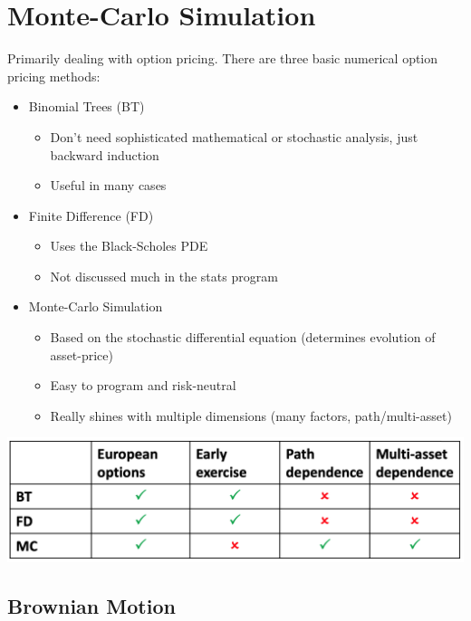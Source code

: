 \documentclass[
  oneside]{book}
\providecommand{\tightlist}{%
  \setlength{\itemsep}{0pt}\setlength{\parskip}{0pt}}
\begin{document}
\hypertarget{monte-carlo-simulation}{%
\chapter{Monte-Carlo Simulation}\label{monte-carlo-simulation}}

Primarily dealing with option pricing. There are three basic numerical option pricing methods:

\begin{itemize}
\tightlist
\item
  Binomial Trees (BT)

  \begin{itemize}
  \tightlist
  \item
    Don't need sophisticated mathematical or stochastic analysis, just backward induction
  \item
    Useful in many cases
  \end{itemize}
\item
  Finite Difference (FD)

  \begin{itemize}
  \tightlist
  \item
    Uses the Black-Scholes PDE
  \item
    Not discussed much in the stats program
  \end{itemize}
\item
  Monte-Carlo Simulation

  \begin{itemize}
  \tightlist
  \item
    Based on the stochastic differential equation (determines evolution of asset-price)
  \item
    Easy to program and risk-neutral
  \item
    Really shines with multiple dimensions (many factors, path/multi-asset)
  \end{itemize}
\end{itemize}

\includegraphics{Notes/Obsidian-Attachments/10-Monte-Carlo.png}

\hypertarget{brownian-motion}{%
\section{Brownian Motion}\label{brownian-motion}}
\end{document}

